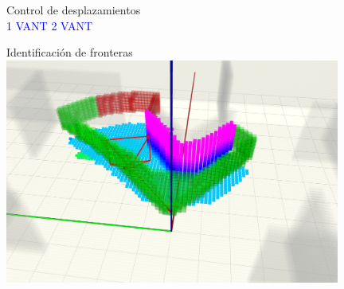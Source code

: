 \documentclass[24pt,aspectratio=169]{beamer}
\begin{document}

\begin{frame}{Control de desplazamientos}
  \bigskip %
  \centering
  \hfil
  \vspace{2pt}\\
  \textcolor{blue}{1 VANT}
  \hfil
  \textcolor{blue}{2 VANT}
\end{frame}

\begin{frame}{Identificación de fronteras}
  \centering
  \bigskip %
  \includegraphics[width=11cm]{fronteras_ros}\\
\end{frame}
  
\end{document}

